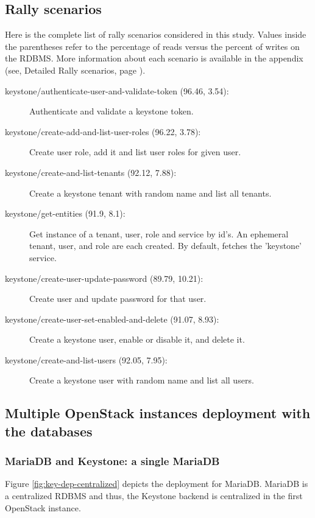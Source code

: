 \subsection{Rally scenarios}

Here is the complete list of rally scenarios considered in this study. Values inside the parentheses refer to the percentage of reads versus the percent of writes on the RDBMS. More information about each scenario is available in the appendix (see, Detailed Rally scenarios, page \pageref{sec:detail-rally}).

\begin{description}
    \item[keystone/authenticate-user-and-validate-token (96.46, 3.54):] Authenticate and validate a keystone token.
    \item[keystone/create-add-and-list-user-roles (96.22, 3.78):] Create user role, add it and list user roles for given user.
    \item[keystone/create-and-list-tenants (92.12, 7.88):] Create a keystone tenant with random name and list all tenants.
    \item[keystone/get-entities (91.9, 8.1):] Get instance of a tenant, user, role and service by id’s. An ephemeral tenant, user, and role are each created. By default, fetches the ’keystone’ service.
    \item[keystone/create-user-update-password (89.79, 10.21):] Create user and update password for that user.
    \item[keystone/create-user-set-enabled-and-delete (91.07, 8.93):] Create a keystone user, enable or disable it, and delete it.
    \item[keystone/create-and-list-users (92.05, 7.95):] Create a keystone user with random name and list all users.
\end{description}



\subsection{Multiple OpenStack instances deployment with the databases}


\subsubsection{MariaDB and Keystone: a single MariaDB}




Figure \ref{fig:key-dep-centralized} depicts the deployment for MariaDB. MariaDB is a centralized RDBMS and thus, the Keystone backend is centralized in the first OpenStack instance.

